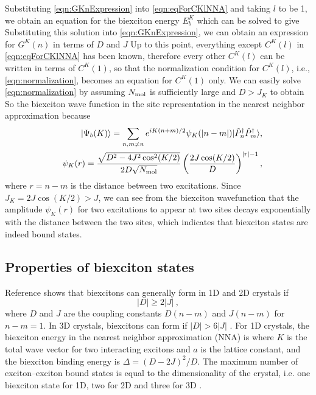 Substituting \autoref{eqn:GKnExpression} into \autoref{eqn:eqForCKlNNA} and taking $l$ to be 1, we obtain an 
equation for the biexciton energy $E^{K}_{b}$ which can be solved to give 
Substituting this solution into \autoref{eqn:GKnExpression}, we can obtain an expression for $G^{K}(n)$ in terms of
$D$ and $J$
Up to this point, everything except $C^{K}(l)$ in \autoref{eqn:eqForCKlNNA} has been known, therefore every other
 $C^{K}(l)$ can be written in terms of $C^{K}(1)$, so that  the normalization condition for $C^{K}(l)$, i.e., 
 \autoref{eqn:normalization}, becomes an equation for $C^{K}(1)$ only. We can easily solve
 \autoref{eqn:normalization} by assuming $N_{\rm mol}$ is sufficiently large and $D > J_{K}$ to obtain
So the biexciton wave function in the site representation in the nearest neighbor approximation because
\begin{eqnarray}
&&| \Psi_b(K) \rangle = \sum\limits_{n,m \neq n} e^{iK(n+m)/2}
\psi_{K}(|n-m|) | \hat P_n^\dag \hat P_m^\dag \rangle , \nonumber \\
&&\psi_{K}(r) = \frac{\sqrt{D^2 - 4 J^2\cos^2 (K/2)}}{2D \sqrt{N_{\rm  mol}}} \left(
\frac{2 J\cos(K/2)}{D} \right)^{|r|-1} , \label{eqn:biexcitonWavefunction}
\end{eqnarray}
where $r=n-m$ is the distance between two excitations. Since $J_{K} = 2 J \cos(K/2) > J$, we can see from the 
biexciton wavefunction that the amplitude $\psi_{K}(r)$ for two excitations to appear at two sites decays 
exponentially with the distance between the two sites, which
 indicates that biexciton states are indeed bound states. 


\subsection{Properties of biexciton states}
\label{sec:propertiesBiexciton}

Reference \cite{vektaris} shows that biexcitons can generally form in 1D and 2D crystals if
\begin{equation}\label{biexc-formation}
|D| \geq 2 |J| \ ,
\end{equation}
where $D$ and $J$ are the coupling constants $D(n-m)$ and $J(n-m)$ for $n-m =1$. In 3D crystals, biexcitons can form
 if $|D| > 6 |J|$ \cite{biexciton-theory-2}. For 1D crystals, the biexciton energy in the nearest neighbor approximation
 (NNA) is 
where $K$ is the total wave vector for two interacting
 excitons and $a$ is the lattice constant, and the biexciton binding energy is $\Delta = (D - 2J)^2/D$. The maximum
 number of exciton--exciton bound states is equal to the dimensionality of the crystal, i.e. one biexciton state for 1D,
 two for 2D and three for 3D \cite{vektaris,note1}. 

